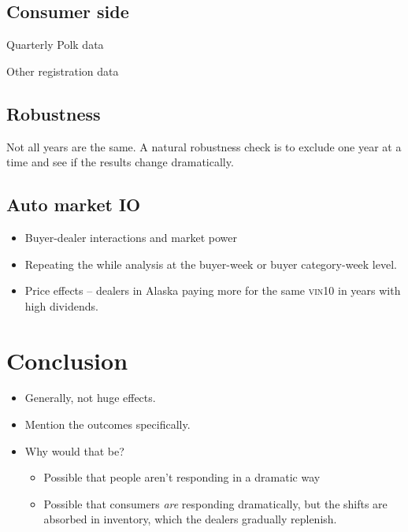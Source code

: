 \documentclass[11pt,letterpaper,oneside]{article}
\newcommand{\vin}{\textsc{vin}}
\begin{document}
\begin{doublespacing}
\subsection{Consumer side}
Quarterly Polk data


Other registration data

\subsection{Robustness}
Not all years are the same.
A natural robustness check is to exclude one year at a time and see if the results change dramatically.

\subsection{Auto market IO}
\begin{itemize}
    \item Buyer-dealer interactions and market power
    \item Repeating the while analysis at the buyer\hyp{}week or buyer category\hyp{}week level.
    \item Price effects -- dealers in Alaska paying more for the same \vin10 in years with high dividends.

\end{itemize}



\section{Conclusion}

\begin{itemize}
    \item Generally, not huge effects.
    \item Mention the outcomes specifically.
    \item Why would that be?
    \begin{itemize}
        \item Possible that people aren't responding in a dramatic way
        \item Possible that consumers \emph{are} responding dramatically, but the shifts are absorbed in inventory, which the dealers gradually replenish.

    \end{itemize}
\end{itemize}

\FloatBarrier


\pagebreak
\end{doublespacing}
\fancyhfoffset[O]{0pt}


\printbibliography

\begin{refsection}
\nocite{*}
\printbibliography[heading=subbibliography, title={Software Used}]
\end{refsection}
\end{document}
